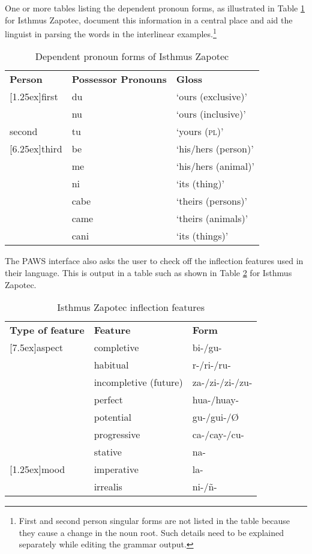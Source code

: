 One or more tables listing the dependent pronoun forms, as illustrated in Table \ref{xIZPossPnDep} for Isthmus Zapotec, document this information in a central place and aid the linguist in parsing the words in the interlinear examples.\footnote{\label{nIZdata}
 First and second person singular forms are not listed in the table because they cause a change in the noun root. Such details need to be explained separately while editing the grammar output.
}

\glossSTDmode

\begin{table}
\begin{tabular}{lll}
{\textbf{Person}} & {\textbf{Possessor Pronouns}} & {\textbf{Gloss}}\\
{\multirow{2}{*}[1.25ex]{first}} & du & {`ours (exclusive)'}\\
 & nu & {`ours (inclusive)'}\\
{second} & tu & {`yours ({\textsc{pl})'}}\\
{\multirow{6}{*}[6.25ex]{third}} & be & {`his/hers (person)'}\\
 & me & {`his/hers (animal)'}\\
 & ni & {`its (thing)'}\\
 & cabe & {`theirs (persons)'}\\
 & came & {`theirs (animals)'}\\
 & cani & {`its (things)'}\\
\end{tabular}
\caption{Dependent pronoun forms of Isthmus Zapotec}
\label{xIZPossPnDep}%
\end{table}

The PAWS interface also asks the user to check off the inflection features used in their language. This is output in a table such as shown in Table \ref{xIZInflectionFeatures} for Isthmus Zapotec.

\begin{table}
\begin{tabular}{lll}
{\textbf{Type of feature}} 	& {\textbf{Feature}} & {\textbf{Form}}\\
{\multirow{7}{*}[7.5ex]{aspect}} & {completive} & {bi-/gu-}\\
				& {habitual} & {r-/ri-/ru-}\\
				& {incompletive (future)} & {za-/zi-/zi-/zu-}\\
				& {perfect} & {hua-/huay-}\\
				& {potential} & {gu-/gui-/Ø}\\
				& {progressive} & {ca-/cay-/cu-}\\
				& {stative} & {na-}\\
{\multirow{2}{*}[1.25ex]{mood}} & {imperative} & {la- }\\
				& {irrealis} & {ni-/ñ-}\\
\end{tabular}
\caption{Isthmus Zapotec inflection features}
 \label{xIZInflectionFeatures}%
\end{table}

